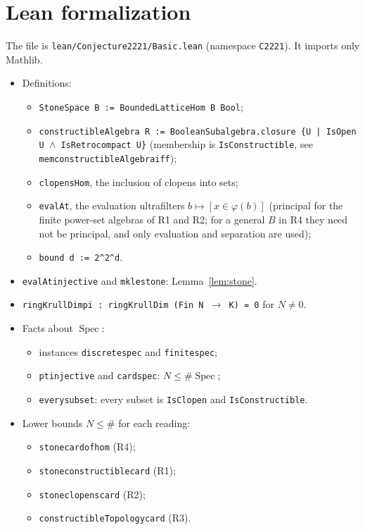 \documentclass[11pt]{article}
\renewcommand{\_}{\oldus\allowbreak}
\theoremstyle{definition}
\theoremstyle{remark}
\begin{document}
\section{Lean formalization}
The file is \texttt{lean/Conjecture2221/Basic.lean} (namespace \texttt{C2221}). It imports only Mathlib.
\begin{itemize}
\item Definitions:
  \begin{itemize}
  \item \texttt{StoneSpace B := BoundedLatticeHom B Bool};
  \item \texttt{constructibleAlgebra R := BooleanSubalgebra.closure \{U | IsOpen U $\wedge$
  IsRetrocompact U\}} (membership is \texttt{IsConstructible}, see
  \texttt{mem\_constructibleAlgebra\_iff});
  \item \texttt{clopensHom}, the inclusion of clopens into sets;
  \item \texttt{evalAt}, the evaluation ultrafilters $b\mapsto[x\in\varphi(b)]$ (principal for the finite power-set algebras of R1 and R2; for a general $B$ in R4 they need not be principal, and only evaluation and separation are used);
  \item \texttt{bound d := 2\textasciicircum 2\textasciicircum d}.
  \end{itemize}
\item \texttt{evalAt\_injective} and \texttt{mk\_le\_stone}: Lemma~\ref{lem:stone}.
\item \texttt{ringKrullDim\_pi : ringKrullDim (Fin N $\to$ K) = 0} for $N\ne0$.
\item Facts about $\operatorname{Spec}$:
  \begin{itemize}
  \item instances \texttt{discrete\_spec} and \texttt{finite\_spec};
  \item \texttt{pt\_injective} and \texttt{card\_spec}: $N\le\#\operatorname{Spec}$;
  \item \texttt{every\_subset}: every subset is \texttt{IsClopen} and \texttt{IsConstructible}.
  \end{itemize}
\item Lower bounds $N\le\#$ for each reading:
  \begin{itemize}
  \item \texttt{stone\_card\_of\_hom} (R4);
  \item \texttt{stone\_constructible\_card} (R1);
  \item \texttt{stone\_clopens\_card} (R2);
  \item \texttt{constructibleTopology\_card} (R3).

\end{itemize}
\end{itemize}
\end{document}
